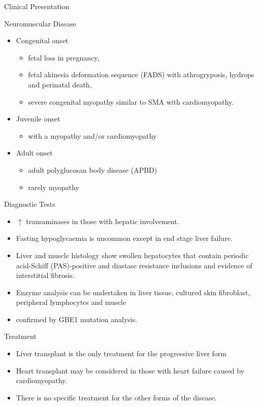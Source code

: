 \documentclass[presentation, smaller]{beamer}
\begin{document}
\begin{frame}[label={sec:org8a00106}]{Clinical Presentation}
\begin{block}{Neuromuscular Disease}
\begin{itemize}
\item Congenital onset
\begin{itemize}
\item fetal loss in pregnancy,
\item fetal akinesia deformation sequence (FADS) with athrogryposis, hydrops and perinatal death,
\item severe congenital myopathy similar to SMA with \textpm{}  cardiomyopathy.
\end{itemize}
\item Juvenile onset
\begin{itemize}
\item with a myopathy and/or cardiomyopathy
\end{itemize}
\item Adult onset
\begin{itemize}
\item adult polyglucosan body disease (APBD)
\item rarely myopathy
\end{itemize}
\end{itemize}
\end{block}
\end{frame}

\begin{frame}[label={sec:org311c79b}]{Diagnostic Tests}
\begin{itemize}
\item \(\uparrow\) transaminases in those with hepatic involvement.
\item Fasting hypoglycaemia is uncommon except in end stage liver failure.
\item Liver and muscle histology show swollen hepatocytes that contain
periodic acid-Schiff (PAS)-positive and diastase resistance
inclusions and evidence of interstitial fibrosis.
\item Enzyme analysis can be undertaken in liver tissue, cultured skin
fibroblast, peripheral lymphocytes and muscle
\item confirmed by GBE1 mutation analysis.
\end{itemize}
\end{frame}

\begin{frame}[label={sec:org606e388}]{Treatment}
\begin{itemize}
\item Liver transplant is the only treatment for the progressive liver form
\item Heart transplant may be considered in those with heart failure caused by cardiomyopathy.
\item There is no specific treatment for the other forms of the disease.
\end{itemize}
\end{frame}
\end{document}
